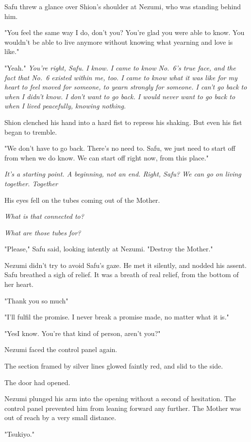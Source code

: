 Safu threw a glance over Shion's shoulder at Nezumi, who was standing
behind him.

"You feel the same way I do, don't you? You're glad you were able to
know. You wouldn't be able to live anymore without knowing what yearning
and love is like."

"\el Yeah." \emph{You're right, Safu. I know. I came to know No.~6's true face,
and the fact that No.~6 existed within me, too. I came to know what it
was like for my heart to feel moved for someone, to yearn strongly for
someone. I can't go back to when I didn't know. I don't want to go back.
I would never want to go back to when I lived peacefully, knowing
nothing.}

Shion clenched his hand into a hard fist to repress his shaking. But
even his fist began to tremble.

"We don't have to go back. There's no need to. Safu, we just need to
start off from when we do know. We can start off right now, from this
place."

\emph{It's a starting point. A beginning, not an end. Right, Safu? We can go
on living together. Together\el }

His eyes fell on the tubes coming out of the Mother.

\emph{What is that connected to?}

\emph{What are those tubes for?}

"Please," Safu said, looking intently at Nezumi. "Destroy the Mother."

Nezumi didn't try to avoid Safu's gaze. He met it silently, and nodded
his assent. Safu breathed a sigh of relief. It was a breath of real
relief, from the bottom of her heart.

"Thank you so much\el "

"I'll fulfil the promise. I never break a promise made, no matter what
it is."

"Yes\el I know. You're that kind of person, aren't you?"

Nezumi faced the control panel again.

The section framed by silver lines glowed faintly red, and slid to the
side.

The door had opened.

Nezumi plunged his arm into the opening without a second of hesitation.
The control panel prevented him from leaning forward any further. The
Mother was out of reach by a very small distance.

"Tsukiyo."

